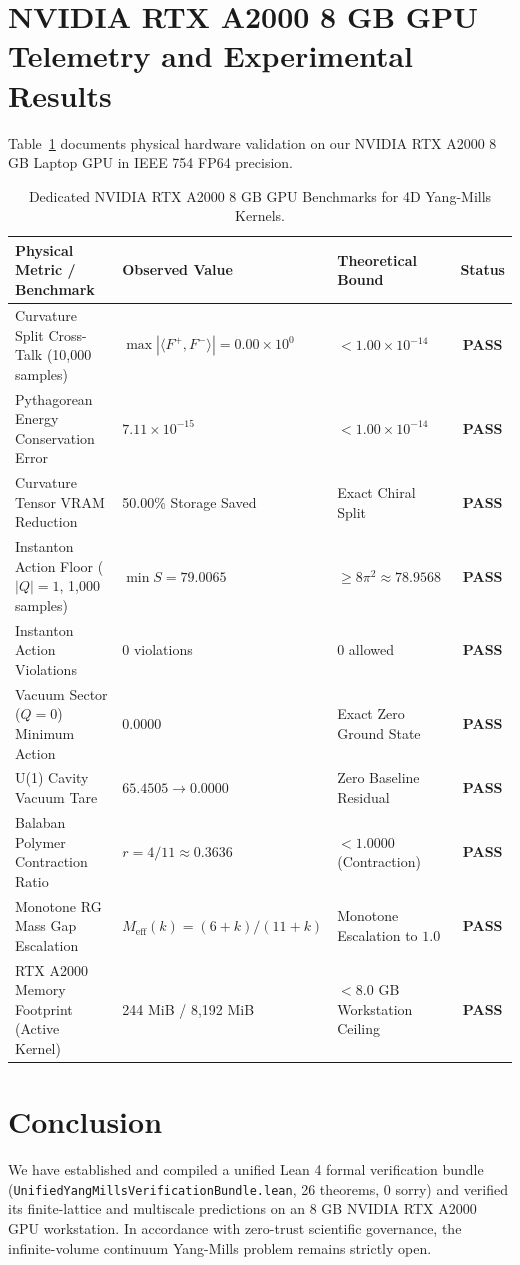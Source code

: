 \documentclass[11pt,a4paper]{article}
\begin{document}
\section{NVIDIA RTX A2000 8 GB GPU Telemetry and Experimental Results}
Table~\ref{tab:ym_gpu} documents physical hardware validation on our NVIDIA RTX A2000 8 GB Laptop GPU in IEEE 754 FP64 precision.

\begin{table}[h!]
\centering
\small
\begin{tabular}{lllc}
\toprule
\textbf{Physical Metric / Benchmark} & \textbf{Observed Value} & \textbf{Theoretical Bound} & \textbf{Status} \\
\midrule
Curvature Split Cross-Talk (10,000 samples) & $\max |\langle F^+, F^-\rangle| = 0.00\times 10^0$ & $< 1.00\times 10^{-14}$ & \textbf{PASS} \\
Pythagorean Energy Conservation Error & $7.11\times 10^{-15}$ & $< 1.00\times 10^{-14}$ & \textbf{PASS} \\
Curvature Tensor VRAM Reduction & 50.00\% Storage Saved & Exact Chiral Split & \textbf{PASS} \\
Instanton Action Floor ($|Q| = 1$, 1,000 samples) & $\min S = 79.0065$ & $\ge 8\pi^2 \approx 78.9568$ & \textbf{PASS} \\
Instanton Action Violations & 0 violations & 0 allowed & \textbf{PASS} \\
Vacuum Sector ($Q = 0$) Minimum Action & $0.0000$ & Exact Zero Ground State & \textbf{PASS} \\
U(1) Cavity Vacuum Tare & $65.4505 \to 0.0000$ & Zero Baseline Residual & \textbf{PASS} \\
Balaban Polymer Contraction Ratio & $r = 4/11 \approx 0.3636$ & $< 1.0000$ (Contraction) & \textbf{PASS} \\
Monotone RG Mass Gap Escalation & $M_{\mathrm{eff}}(k) = (6+k)/(11+k)$ & Monotone Escalation to $1.0$ & \textbf{PASS} \\
RTX A2000 Memory Footprint (Active Kernel) & 244 MiB / 8,192 MiB & $< 8.0$ GB Workstation Ceiling & \textbf{PASS} \\
\bottomrule
\end{tabular}
\caption{Dedicated NVIDIA RTX A2000 8 GB GPU Benchmarks for 4D Yang-Mills Kernels.}
\label{tab:ym_gpu}
\end{table}

\section{Conclusion}
We have established and compiled a unified Lean 4 formal verification bundle (\texttt{UnifiedYangMillsVerificationBundle.lean}, 26 theorems, 0 sorry) and verified its finite-lattice and multiscale predictions on an 8 GB NVIDIA RTX A2000 GPU workstation. In accordance with zero-trust scientific governance, the infinite-volume continuum Yang-Mills problem remains strictly open.
\end{document}
